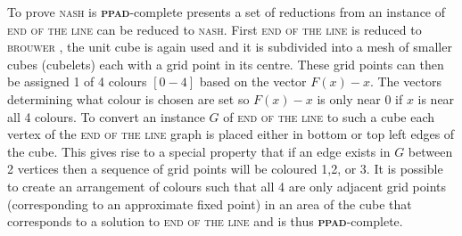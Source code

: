 \documentclass{article}
\begin{document}
\begin{multicols}{2}
To prove \textsc{nash} is \textbf{\textsc{ppad}}-complete \cite{Daskalakis.2009} presents a set of reductions from an instance of \textsc{end of the line} can be reduced to \textsc{nash}. First \textsc{end of the line} is reduced to \textsc{brouwer} \textbf{}, the unit cube is again used and it is subdivided into a mesh of smaller cubes (cubelets)  each with a grid point in its centre. These grid points can then be assigned 1 of 4 colours $[0-4]$ based on the vector $F(x)-x$. The vectors determining what colour is chosen are set so $F(x)-x$ is only near $0$ if $x$ is near all 4 colours. To convert an instance $G$ of \textsc{end of the line} to such a cube each vertex of the \textsc{end of the line} graph is placed either in bottom or top left edges of the cube. This gives rise to a special property that if an edge exists in $G$ between 2 vertices then a sequence of grid points will be coloured 1,2, or 3. It is possible to create an arrangement of colours such that all 4 are only adjacent grid points (corresponding to an approximate fixed point) in an area of the cube that corresponds to a solution to \textsc{end of the line} and is thus \textbf{\textbf{\textsc{ppad}}}-complete.


\end{multicols}
\end{document}
